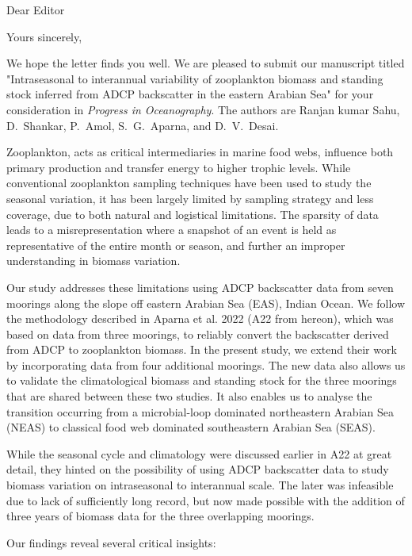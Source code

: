 \documentclass[11pt,a4paper,roman]{moderncv}        %
\begin{document}
	
	\date{\today}
	\opening{Dear Editor}
	\closing{Yours sincerely,}


	\makelettertitle
	\justifying
	We hope the letter finds you well. We are pleased to submit our manuscript titled "Intraseasonal to interannual variability of zooplankton biomass and standing stock inferred from ADCP backscatter in the eastern Arabian Sea" for your consideration in \textit{Progress in Oceanography}. The authors are Ranjan kumar Sahu, D.~Shankar, P.~Amol, S.~G.~Aparna, and D.~V.~Desai.
	
	Zooplankton, acts as critical intermediaries in marine food webs, influence both primary production and transfer energy to higher trophic levels. While conventional zooplankton sampling techniques have been used to study the seasonal variation, it has been largely limited by sampling strategy and less coverage, due to both natural and logistical limitations. The sparsity of data leads to a misrepresentation where a snapshot of an event is held as representative of the entire month or season, and further 
	an improper understanding in biomass variation. 
	
	Our study addresses these limitations using ADCP backscatter data from seven moorings along the slope off eastern Arabian Sea (EAS), Indian Ocean. We follow the methodology described in Aparna et al. 2022 (A22 from hereon), which was based on data from three moorings, to reliably convert the backscatter derived from ADCP to zooplankton biomass. In the present study, we extend their work by incorporating data from four additional moorings. The new data also allows us to validate the climatological biomass and standing stock for the three moorings that are shared between these two studies. It also enables us to analyse the transition occurring from a microbial-loop dominated northeastern Arabian Sea (NEAS) to classical food web dominated southeastern Arabian Sea (SEAS).
	
	While the seasonal cycle and climatology were discussed earlier in A22 at great detail, they hinted on the possibility of using ADCP backscatter data to study biomass variation on intraseasonal to interannual scale. The later was infeasible due to lack of sufficiently long record, but now made possible with the addition of three years of biomass data for the three overlapping moorings. 
	
	Our findings reveal several critical insights:
	
\end{document}
